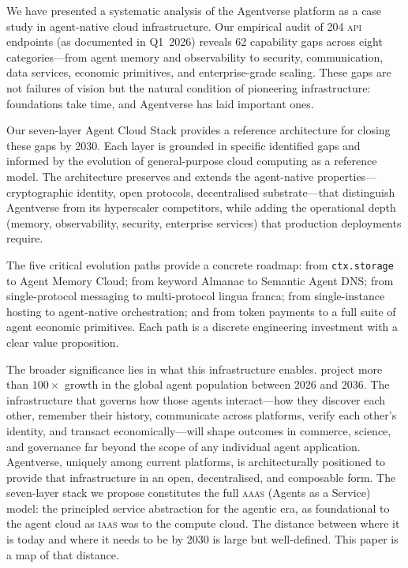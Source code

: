 \documentclass[twoside,11pt]{article}
\begin{document}
We have presented a systematic analysis of the Agentverse platform as a case
study in agent-native cloud infrastructure.  Our empirical audit of 204 \textsc{api} endpoints (as documented in Q1~2026)
reveals 62 capability gaps across eight
categories---from agent memory and observability to security, communication,
data services, economic primitives, and enterprise-grade scaling.  These gaps
are not failures of vision but the natural condition of pioneering
infrastructure: foundations take time, and Agentverse has laid important ones.

Our seven-layer Agent Cloud Stack provides a reference architecture for closing
these gaps by 2030.  Each layer is grounded in specific identified gaps and
informed by the evolution of general-purpose cloud computing as a reference
model.  The architecture preserves and extends the agent-native
properties---cryptographic identity, open protocols, decentralised
substrate---that distinguish Agentverse from its hyperscaler competitors, while
adding the operational depth (memory, observability, security, enterprise
services) that production deployments require.

The five critical evolution paths provide a concrete roadmap: from
\texttt{ctx.storage} to Agent Memory Cloud; from keyword Almanac to Semantic
Agent DNS; from single-protocol messaging to multi-protocol lingua franca; from
single-instance hosting to agent-native orchestration; and from token payments
to a full suite of agent economic primitives.  Each path is a discrete
engineering investment with a clear value proposition.

The broader significance lies in what this infrastructure enables.
\citet{hussein2025forecast} project more than $100\times$ growth in the global
agent population between 2026 and 2036.  The infrastructure that governs how
those agents interact---how they discover each other, remember their history,
communicate across platforms, verify each other's identity, and transact
economically---will shape outcomes in commerce, science, and governance far
beyond the scope of any individual agent application.  Agentverse, uniquely
among current platforms, is architecturally positioned to provide that
infrastructure in an open, decentralised, and composable form.  The seven-layer
stack we propose constitutes the full \textsc{aaas} (Agents as a Service)
model: the principled service abstraction for the agentic era, as foundational
to the agent cloud as \textsc{iaas} was to the compute cloud.  The distance
between where it is today and where it needs to be by 2030 is large but
well-defined.  This paper is a map of that distance.
\end{document}
